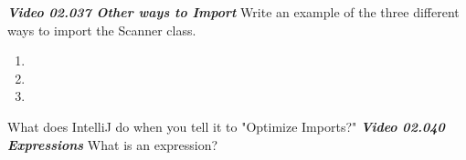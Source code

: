 \documentclass[letterpaper,11pt]{exam}
\newcommand{\videoheading}[1]{\Large\textbf{\textit{#1}}}
\begin{document}
\begin{questions}
\begin{samepage}
\videoheading{Video 02.037 Other ways to Import}
\question Write an example of the three different ways to import the Scanner class.
\begin{enumerate}
  \item
  \item
  \item
\end{enumerate}
\end{samepage}
\question What does IntelliJ do when you tell it to "Optimize Imports?"
\vspace{1cm}
\videoheading{Video 02.040 Expressions}
\question What is an expression?
\end{questions}
\end{document}
